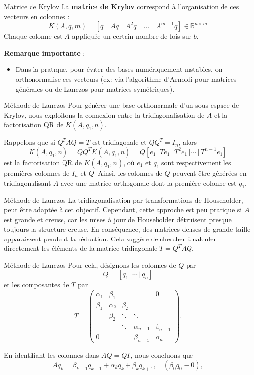 \documentclass[french, 10pt]{beamer}
\theoremstyle{definition}
\begin{document}
\begin{frame}{Matrice de Krylov}
	La \textbf{matrice de Krylov} correspond à l’organisation de ces vecteurs en colonnes :
	\[
	K(A, q, m) = [q \quad Aq \quad A^2q \quad \dots \quad A^{m-1}q] \in \mathbb{R}^{n \times m}
	\]
	Chaque colonne est \(A\) appliquée un certain nombre de fois sur \(b\).
	
	\textbf{Remarque importante} :
	\begin{itemize}
		\item Dans la pratique, pour éviter des bases numériquement instables, on orthonormalise ces vecteurs (ex: via l'algorithme d'Arnoldi pour matrices générales ou de Lanczos pour matrices symétriques).
	\end{itemize}
\end{frame}
\begin{frame}{Méthode de Lanczos}
	Pour générer une base orthonormale d’un sous-espace de Krylov, nous exploitons la connexion entre la tridiagonalisation de \( A \) et la factorisation QR de \( K(A, q_1, n) \).
	
	Rappelons que si \( Q^T A Q = T \) est tridiagonale et \( QQ^T = I_n \), alors
	\[
	K(A, q_1, n) = QQ^T K(A, q_1, n) = Q \left[ e_1 \,|\, Te_1 \,|\, T^2 e_1 \,|\, \cdots \,|\, T^{n-1}e_1 \right]
	\]
	est la factorisation QR de \( K(A, q_1, n) \), où \( e_1 \) et \( q_1 \) sont respectivement les premières colonnes de \( I_n \) et \( Q \). Ainsi, les colonnes de \( Q \) peuvent être générées en tridiagonalisant \( A \) avec une matrice orthogonale dont la première colonne est \( q_1 \).
	
\end{frame}
\begin{frame}{Méthode de Lanczos}
	La tridiagonalisation par transformations de Householder, peut être adaptée à cet objectif. Cependant, cette approche est peu pratique si \( A \) est grande et creuse, car les mises à jour de Householder détruisent presque toujours la structure creuse. En conséquence, des matrices denses de grande taille apparaissent pendant la réduction. Cela suggère de chercher à calculer directement les éléments de la matrice tridiagonale \( T = Q^T A Q \).
	
\end{frame}
\begin{frame}{Méthode de Lanczos}
	Pour cela, désignons les colonnes de \( Q \) par
	\[
	Q = [q_1 \,|\, \cdots \,|\, q_n]
	\]
	et les composantes de \( T \) par
	\[
	T = 
	\begin{pmatrix}
		\alpha_1 & \beta_1 & & & 0 \\
		\beta_1 & \alpha_2 & \beta_2 & & \\
		& \beta_2 & \ddots & \ddots & \\
		& & \ddots & \alpha_{n-1} & \beta_{n-1} \\
		0 & & & \beta_{n-1} & \alpha_n
	\end{pmatrix}.
	\]
	
	En identifiant les colonnes dans \( AQ = QT \), nous concluons que
	\[
	Aq_k = \beta_{k-1}q_{k-1} + \alpha_k q_k + \beta_k q_{k+1},
	\quad (\beta_0 q_0 \equiv 0),
	\] 
\end{frame}
\end{document}
